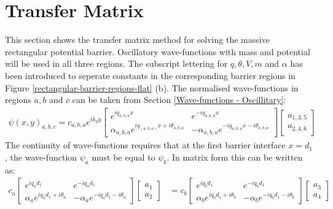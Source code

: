 	\section{Transfer Matrix}
	\label{Rectangular Barrier - Transfer Matrix}
		This section shows the transfer matrix method for solving the massive rectangular potential barrier. Oscillatory wave-functions with mass and potential will be used in all three regions. The subscript lettering for $q, \theta, V, m$ and $\alpha$ has been introduced to seperate constants in the corresponding barrier regions in Figure \ref{rectangular-barrier-regions-flat} (b). The normalised wave-functions in regions $a,b$ and $c$ can be taken from Section \ref{Wave-functions - Oscillitary}:
			\begin{align}
				\psi\left(x,y\right)_{a,b,c}=
				c_{a,b,a}e^{ik_{y}y}
				\left[\begin{array}{ccc}
					e^{iq_{a,b,a}x}&e^{-iq_{a,b,a}x}\\
					\alpha_{a,b,a}e^{iq_{\left(a,b,a\right)}x+i\theta_{a,b,a}}&-\alpha_{a,b,a}e^{-iq_{a,b,a}x-i\theta_{a,b,a}}
				\end{array}\right]
				\left[\begin{array}{ccc}
					a_{1,3,5}\\
					a_{2,4,6}
				\end{array}\right]
			\end{align}
			The continuity of wave-functions requires that at the first barrier interface $x=d_{1}$, the wave-function $\psi_{a}$ must be equal to $\psi_{b}$. In matrix form this can be written as:
			\begin{align}
				c_{a}
				\left[\begin{array}{ccc}
					e^{iq_{a}d_{1}}&e^{-iq_{a}d_{1}}\\
					\alpha_{a}e^{iq_{a}d_{1}+i\theta_{a}}&-\alpha_{a}e^{-iq_{a}d_{1}-i\theta_{a}}
				\end{array}\right]
				\left[\begin{array}{ccc}
					a_{1}\\
					a_{2}
				\end{array}\right]
				&=
				c_{b}
				\left[\begin{array}{ccc}
					e^{iq_{b}d_{1}}&e^{-iq_{b}d_{1}}\\
					\alpha_{b}e^{iq_{b}d_{1}+i\theta_{b}}&-\alpha_{b}e^{-iq_{b}d_{1}-i\theta_{b}}
				\end{array}\right]
				\left[\begin{array}{ccc}
					a_{3}\\
					a_{4}
				\end{array}\right]
			\end{align}
